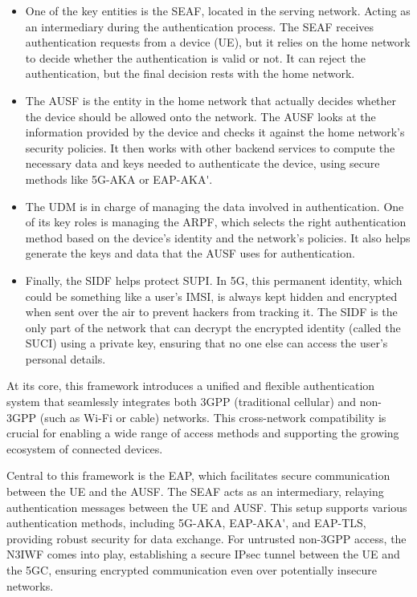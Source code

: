 \begin{itemize}
    \item{
                One of the key entities is the \ac{SEAF}, located in the serving network. Acting as an intermediary during the authentication process. The \ac{SEAF} receives authentication requests from a device (\ac{UE}), but it relies on the home network to decide whether the authentication is valid or not. It can reject the authentication, but the final decision rests with the home network.
          }
    \item{
                The \ac{AUSF} is the entity in the home network that actually decides whether the device should be allowed onto the network. The \ac{AUSF} looks at the information provided by the device and checks it against the home network's security policies. It then works with other backend services to compute the necessary data and keys needed to authenticate the device, using secure methods like \ac{5G-AKA} or \ac{EAP-AKA'}.
          }
    \item{
                The \ac{UDM} is in charge of managing the data involved in authentication. One of its key roles is managing the \ac{ARPF}, which selects the right authentication method based on the device's identity and the network's policies. It also helps generate the keys and data that the \ac{AUSF} uses for authentication.
          }
    \item{
                Finally, the \ac{SIDF} helps protect \ac{SUPI}. In \ac{5G}, this permanent identity, which could be something like a user’s \ac{IMSI}, is always kept hidden and encrypted when sent over the air to prevent hackers from tracking it. The \ac{SIDF} is the only part of the network that can decrypt the encrypted identity (called the \ac{SUCI}) using a private key, ensuring that no one else can access the user’s personal details.
          }
\end{itemize}

At its core, this framework introduces a unified and flexible authentication system that seamlessly integrates both \ac{3GPP} (traditional cellular) and non-\ac{3GPP} (such as Wi-Fi or cable) networks. This cross-network compatibility is crucial for enabling a wide range of access methods and supporting the growing ecosystem of connected devices.

Central to this framework is the \ac{EAP}, which facilitates secure communication between the \ac{UE} and the \ac{AUSF}. The \ac{SEAF} acts as an intermediary, relaying authentication messages between the \ac{UE} and \ac{AUSF}. This setup supports various authentication methods, including \ac{5G-AKA}, \ac{EAP-AKA'}, and \ac{EAP-TLS}, providing robust security for data exchange. For untrusted non-\ac{3GPP} access, the \ac{N3IWF} comes into play, establishing a secure \ac{IPsec} tunnel between the \ac{UE} and the \acl{5GC}, ensuring encrypted communication even over potentially insecure networks.%


